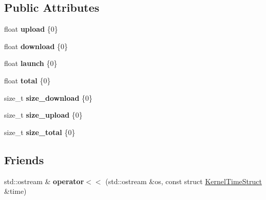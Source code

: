\subsection*{Public Attributes}
\begin{DoxyCompactItemize}
\item 
\mbox{\label{structyacx_1_1_kernel_time_struct_ae1060dc716dcc7c0d48e78f6abe2bb84}} 
float {\bfseries upload} \{0\}
\item 
\mbox{\label{structyacx_1_1_kernel_time_struct_a90956df8695c7e9b4e7981f4de3088d5}} 
float {\bfseries download} \{0\}
\item 
\mbox{\label{structyacx_1_1_kernel_time_struct_a8fe519321682fd961f6f8aa5b3f5aa77}} 
float {\bfseries launch} \{0\}
\item 
\mbox{\label{structyacx_1_1_kernel_time_struct_a6b3c2af20a12bfb4ac20c98b6c82e4a7}} 
float {\bfseries total} \{0\}
\item 
\mbox{\label{structyacx_1_1_kernel_time_struct_a34852ae7e8720b538267ec8435ef1d12}} 
size\+\_\+t {\bfseries size\+\_\+download} \{0\}
\item 
\mbox{\label{structyacx_1_1_kernel_time_struct_a08641e2c4607eacf1ac9514a098831d1}} 
size\+\_\+t {\bfseries size\+\_\+upload} \{0\}
\item 
\mbox{\label{structyacx_1_1_kernel_time_struct_afdc3c835baec675e2381d86bd422adde}} 
size\+\_\+t {\bfseries size\+\_\+total} \{0\}
\end{DoxyCompactItemize}
\subsection*{Friends}
\begin{DoxyCompactItemize}
\item 
\mbox{\label{structyacx_1_1_kernel_time_struct_a3788fbdefa74595d7932753f01973b1c}} 
std\+::ostream \& {\bfseries operator$<$$<$} (std\+::ostream \&os, const struct \hyperlink{structyacx_1_1_kernel_time_struct}{Kernel\+Time\+Struct} \&time)
\end{DoxyCompactItemize}


